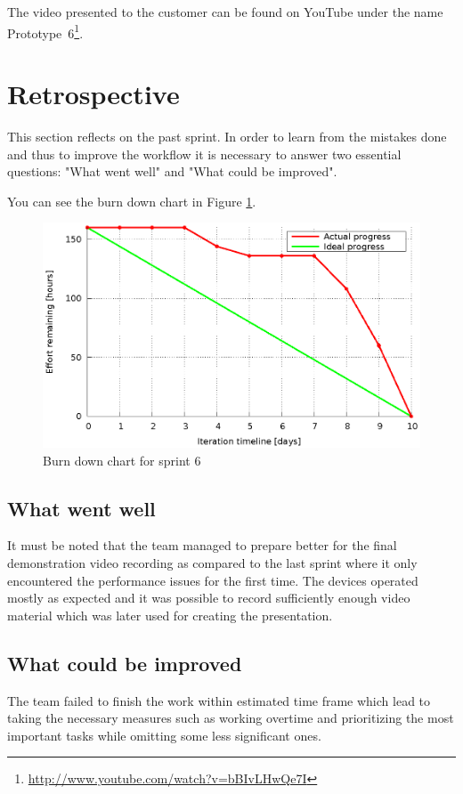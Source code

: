 The video presented to the customer can be found on YouTube under the name Prototype~6\footnote{\url{http://www.youtube.com/watch?v=bBIvLHwQe7I}}.

\section{Retrospective}
This section reflects on the past sprint. In order to learn from the mistakes done and thus to improve the workflow it is necessary to answer two essential questions: "What went well" and "What could be improved".

You can see the burn down chart in Figure \ref{fig:Burn6}.
\begin{figure}[h]
	\centering
		\includegraphics[width=14cm]{burndowns/sprint6.eps}
	\caption{Burn down chart for sprint 6}
	\label{fig:Burn6}
\end{figure}

\subsection{What went well}
It must be noted that the team managed to prepare better for the final demonstration video recording as compared to the last sprint where it only encountered the performance issues for the first time. The devices operated mostly as expected and it was possible to record sufficiently enough video material which was later used for creating the presentation.

\subsection{What could be improved}
The team failed to finish the work within estimated time frame which lead to taking the necessary measures such as working overtime and prioritizing the most important tasks while omitting some less significant ones.
